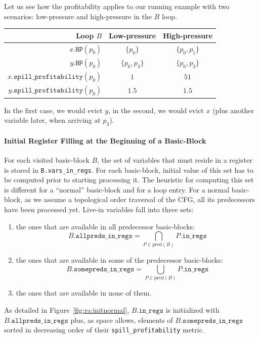 {Let us see how the profitability applies to our running example with two scenarios: low-pressure and high-pressure in the $B$ loop.

\begin{center}
  \begin{tabular}{r@{\quad}cc}
  Loop $B$ & Low-pressure & High-pressure \\
  \hline
  $x.\texttt{HP}(p_0)$ & $\{p_0\}$ & $\{p_0,p_1\}$ \\
  $y.\texttt{HP}(p_0)$ & $\{p_0,p_3\}$ & $\{p_0,p_3\}$ \\
  $x.\texttt{spill\_profitability}(p_0)$ & $1$ & $51$ \\
  $y.\texttt{spill\_profitability}(p_0)$ & $1.5$ & $1.5$ \\
\end{tabular}
\end{center}

In the first case, we would evict $y$, in the second, we would evict $x$ (plus another variable later, when arriving at $p_3$).

\paragraph{Initial Register Filling at the Beginning of a Basic-Block}
For each visited basic-block $B$, the set of variables that must reside in a register is stored in \verb+B.vars_in_regs+.
For each basic-block, initial value of this set has to be computed prior to starting processing it.
The heuristic for computing this set is different for a ``normal'' basic-block and for a loop entry.
For a normal basic-block, as we assume a topological order traversal of the CFG, all its predecessors have been processed yet.
Live-in variables fall into three sets:
\begin{enumerate}
\item the ones that are available in all predecessor basic-blocks:
  $$B.\texttt{allpreds\_in\_regs}=\bigcap_{P\in \textrm{pred}(B)} P.\texttt{in\_regs}$$
\item the ones that are available in some of the predecessor basic-blocks:
  $$B.\texttt{somepreds\_in\_regs}=\bigcup_{P\in \textrm{pred}(B)} P.\texttt{in\_regs}$$
\item the ones that are available in none of them.
\end{enumerate}
As detailed in Figure~\ref{fig:ra:initnormal}, $B.\texttt{in\_regs}$ is initialized with $B.\texttt{allpreds\_in\_regs}$ plus, as space allows, elements of $B.\texttt{somepreds\_in\_regs}$ sorted in decreasing order of their \texttt{spill\_profitability} metric.

}
